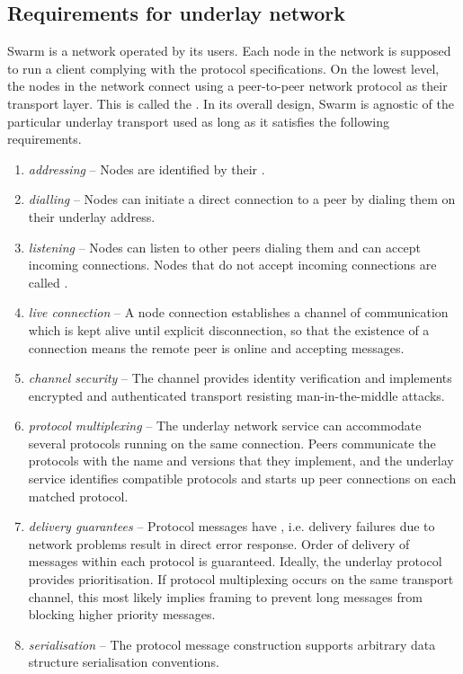 \subsection{Requirements for underlay network \statusyellow}\label{sec:underlay-transport} 

\yellow{}

Swarm is a network operated by its users. Each node in the network is supposed to run a client complying with the protocol specifications. On the lowest level, the nodes in the network connect using a peer-to-peer network protocol as their transport layer. This is called the . 
In its overall design, Swarm is agnostic of the particular underlay transport used as long as it satisfies the following requirements.

\begin{enumerate}[noitemsep]
    \item \emph{addressing} -- Nodes are identified by their .
    \item \emph{dialling} -- Nodes can initiate a direct connection to a peer by dialing them on their underlay address.
    \item \emph{listening} -- Nodes can listen to other peers dialing them and can accept incoming connections. Nodes that do not accept incoming connections are called .
    \item \emph{live connection} -- A node connection establishes a channel of communication which is kept alive until explicit disconnection, so that the existence of a connection means the remote peer is online and accepting messages.
    \item \emph{channel security} -- 
    The channel provides identity verification and implements encrypted and authenticated transport resisting man-in-the-middle attacks.
    \item \emph{protocol multiplexing} -- 
    The underlay network service can accommodate several protocols running on the same connection. Peers communicate the protocols with the name and versions that they implement, and the underlay service identifies compatible protocols and starts up peer connections on each matched protocol. 
    \item \emph{delivery guarantees} -- 
    Protocol messages have , i.e. delivery failures due to network problems result in direct error response. 
    Order of delivery of messages within each protocol is guaranteed. 
    Ideally, the underlay protocol provides prioritisation. 
    If protocol multiplexing occurs on the same transport channel, this most likely implies framing to prevent long messages from blocking higher priority messages.
    \item \emph{serialisation} -- 
    The protocol message construction supports arbitrary data structure serialisation conventions.
    
\end{enumerate}


